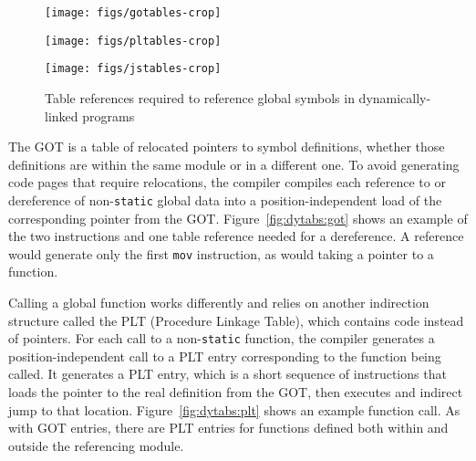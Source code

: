 \begin{figure*}
\begin{minipage}{\textwidth}
	\texttt{[image: figs/gotables-crop]}
	\label{fig:dytabs:got}
	\end{minipage}

	\begin{minipage}{\textwidth}
	\texttt{[image: figs/pltables-crop]}
	\label{fig:dytabs:plt}
	\end{minipage}

	\begin{minipage}{\textwidth}
	\texttt{[image: figs/jstables-crop]}
	\label{fig:dytabs:lazy}
	\end{minipage}
\caption{Table references required to reference global symbols in dynamically-linked
programs}
\label{fig:dytabs}
\end{figure*}

The GOT is a table of relocated pointers to symbol definitions, whether those
definitions are within the same module or in a different one.  To avoid generating
code pages that require relocations, the compiler compiles each reference to or
dereference of non-\texttt{static} global data into a position-independent load of
the corresponding pointer from the GOT.  Figure~\ref{fig:dytabs:got} shows an example
of the two instructions and one table reference needed for a dereference.  A
reference would generate only the first \texttt{mov} instruction, as would taking a
pointer to a function.

Calling a global function works differently and relies on another indirection
structure called the PLT (Procedure Linkage Table), which contains code instead of
pointers.  For each call to a non-\texttt{static} function, the compiler generates a
position-independent call to a PLT entry corresponding to the function being called.
It generates a PLT entry, which is a short sequence of instructions that loads the
pointer to the real definition from the GOT, then executes and indirect jump to that
location.  Figure~\ref{fig:dytabs:plt} shows an example function call.  As with GOT
entries, there are PLT entries for functions defined both within and outside the
referencing module.

